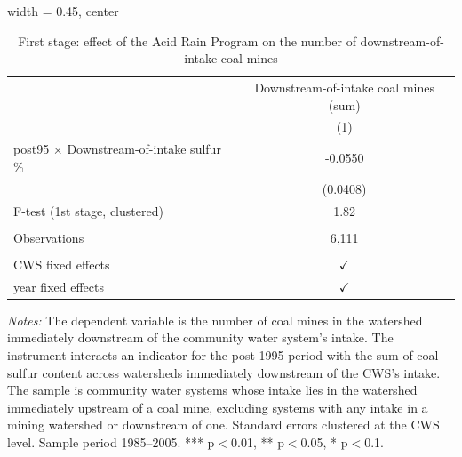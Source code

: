 
\begin{table}[htbp]
   
   \caption{\label{tab:fs_placebo_dwnstrmintake_minevio_ivsum_binvio} First stage: effect of the Acid Rain Program on the number of downstream-of-intake coal mines}
   \bigskip
   
   \centering
   
   \begin{adjustbox}{width = 0.45\textwidth, center}
      
      
      \begin{tabular}{lc}
         \toprule
         
                                                          & Downstream-of-intake coal mines (sum)\\  
         
                                                          & (1)\\  
         
         \midrule 
         post95 $\times$ Downstream-of-intake sulfur \%   & -0.0550\\   
                                                          & (0.0408)\\   
         
         F-test (1st stage, clustered)                    & 1.82\\  
         
          \\
         
         Observations                                     & 6,111\\  
         
          \\
         
         CWS fixed effects                                & $\checkmark$\\   
         year fixed effects                               & $\checkmark$\\   
         
         \bottomrule
         
      \end{tabular}
      
      
      
   \end{adjustbox}
      {\tiny\linespread{1}\selectfont \par \raggedright 
   \textit{Notes:} The dependent variable is the number of coal mines in the watershed immediately downstream of the community water system's intake. The instrument interacts an indicator for the post-1995 period with the sum of coal sulfur content across watersheds immediately downstream of the CWS's intake. The sample is community water systems whose intake lies in the watershed immediately upstream of a coal mine, excluding systems with any intake in a mining watershed or downstream of one. Standard errors clustered at the CWS level. Sample period 1985--2005. *** p$<$0.01, ** p$<$0.05, * p$<$0.1.}
   
\end{table}



